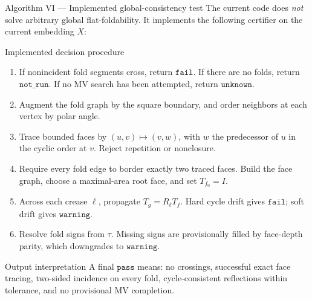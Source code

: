 \documentclass[aspectratio=169,10pt]{beamer}
\begin{document}
\begin{frame}{Algorithm VI — Implemented global-consistency test}
\footnotesize The current code does \emph{not} solve arbitrary global flat-foldability. It implements the following certifier on the current embedding \(X\):

\begin{block}{Implemented decision procedure}
\begin{enumerate}\footnotesize
  \item If nonincident fold segments cross, return \(\texttt{fail}\). If there are no folds, return \(\texttt{not\_run}\). If no MV search has been attempted, return \(\texttt{unknown}\).
  \item Augment the fold graph by the square boundary, and order neighbors at each vertex by polar angle.
  \item Trace bounded faces by \((u,v)\mapsto(v,w)\), with \(w\) the predecessor of \(u\) in the cyclic order at \(v\). Reject repetition or nonclosure.
  \item Require every fold edge to border exactly two traced faces. Build the face graph, choose a maximal-area root face, and set \(T_{f_0}=I\).
  \item Across each crease \(\ell\), propagate \(T_g=R_{\ell}T_f\). Hard cycle drift gives \(\texttt{fail}\); soft drift gives \(\texttt{warning}\).
  \item Resolve fold signs from \(\tau\). Missing signs are provisionally filled by face-depth parity, which downgrades to \(\texttt{warning}\).
\end{enumerate}
\end{block}

\begin{alertblock}{Output interpretation}
\footnotesize A final \(\texttt{pass}\) means: no crossings, successful exact
face tracing, two-sided incidence on every fold, cycle-consistent reflections
within tolerance, and no provisional MV completion.
\end{alertblock}
\end{frame}
\end{document}
